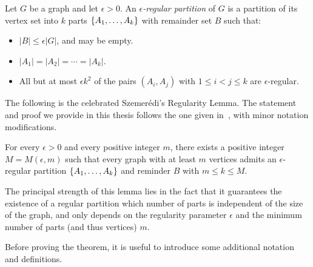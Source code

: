         \begin{definition}
            Let $G$ be a graph and let $\epsilon > 0$.
            An \emph{$\epsilon$-regular partition} of $G$ is a partition of its vertex set into $k$ parts
            $\{ A_1, \ldots, A_k \}$ with remainder set $B$ such that:
            \begin{itemize}
                \item $|B| \leq \epsilon |G|$, and may be empty.
                \item $|A_1| = |A_2| = \cdots = |A_k|$.
                \item All but at most $\epsilon k^2$ of the pairs $(A_i, A_j)$ with $1 \leq i < j \leq k$ are
                    $\epsilon$-regular.
            \end{itemize}
        \end{definition}

        The following is the celebrated Szemer\'edi's Regularity Lemma.
        The statement and proof we provide in this thesis follows the one given in~\cite{extremal_graph_theory},
        with minor notation modifications.

        \begin{theorem}
            For every $\epsilon > 0$ and every positive integer $m$, there exists a positive integer $M = M(\epsilon, m)$
            such that every graph with at least $m$ vertices admits an $\epsilon$-regular partition
            $\{ A_1, \ldots, A_k \}$ and reminder $B$ with $m \leq k \leq M$.
        \end{theorem}

        The principal strength of this lemma lies in the fact that it guarantees the existence of a regular partition
        which number of parts is independent of the size of the graph, and only depends on the regularity parameter
        $\epsilon$ and the minimum number of parts (and thus vertices) $m$.

        Before proving the theorem, it is useful to introduce some additional notation and definitions.